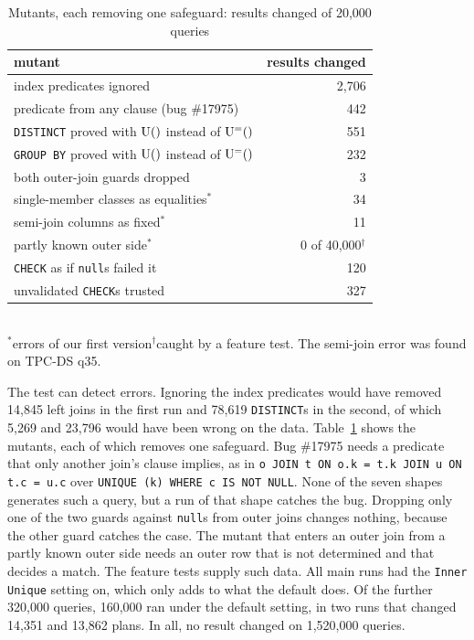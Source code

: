 \documentclass[conference]{IEEEtran}
\theoremstyle{definition}
\newcommand{\sql}[1]{\texttt{#1}}
\newcommand{\nul}{\texttt{null}}
\newcommand{\U}[1]{\mathrm{U}(#1)}
\newcommand{\Ueq}[1]{\mathrm{U}^{=}(#1)}
\begin{document}
\begin{table}[t]\centering\footnotesize\setlength{\tabcolsep}{3pt}
\caption{Mutants, each removing one safeguard: results changed of 20{,}000 queries}\label{tab:mutants}
\begin{tabular}{@{}lr@{}}\toprule
mutant & results changed\\\midrule
index predicates ignored & 2{,}706\\
predicate from any clause (bug \#17975) & 442\\
\sql{DISTINCT} proved with $\U$ instead of $\Ueq$ & 551\\
\sql{GROUP BY} proved with $\U$ instead of $\Ueq$ & 232\\
both outer-join guards dropped & 3\\
single-member classes as equalities$^*$ & 34\\
semi-join columns as fixed$^*$ & 11\\
partly known outer side$^*$ & 0 of 40{,}000$^\dagger$\\
\sql{CHECK} as if \nul s failed it & 120\\
unvalidated \sql{CHECK}s trusted & 327\\\bottomrule
\end{tabular}
\\[2pt]{\footnotesize $^*$errors of our first version\quad $^\dagger$caught by a feature test. The semi-join error was found on TPC-DS q35.}
\end{table}

The test can detect errors. Ignoring the index predicates would have removed 14{,}845 left joins in the first run and
78{,}619 \sql{DISTINCT}s in the second, of which 5{,}269 and 23{,}796 would have been wrong on the data. Table~\ref{tab:mutants} shows the mutants, each of which removes one
safeguard. Bug \#17975 needs a predicate that only another join's clause implies, as in \sql{o JOIN t ON o.k = t.k JOIN
u ON t.c = u.c} over \sql{UNIQUE (k) WHERE c IS NOT NULL}. None of the seven shapes generates such a query, but a run of that
shape catches the bug. Dropping only one of the two guards against \nul s from outer joins changes nothing, because the
other guard catches the case. The mutant that enters an outer join from a partly known outer side needs an outer row
that is not determined and that decides a match. The feature tests supply such data. All main runs had the
\sql{Inner Unique} setting on, which only adds to what the default does. Of the further 320{,}000 queries, 160{,}000 ran under the
default setting, in two runs that changed 14{,}351 and 13{,}862 plans. In all, no result changed on 1{,}520{,}000 queries.
\end{document}
